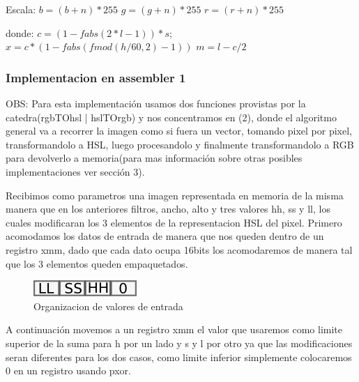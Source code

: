 \documentclass[a4paper]{article}
\begin{document}
\begin{enumerate}
		Escala:\newline
		$b = (b+n) * 255$\newline
		$g = (g+n) * 255$\newline
		$r = (r+n) * 255$\newline

		donde:\newline
		$c = ( 1 - fabs( 2*l - 1 )) * s;$\newline
		$x = c * ( 1 - fabs( fmod( h/60, 2 ) - 1 ) )$\newline
		$m = l - c / 2$\newline


\end{enumerate}

\subsubsection{Implementacion en assembler 1}
OBS: Para esta implementación usamos dos funciones provistas por la catedra(rgbTOhsl | hslTOrgb) y nos concentramos en (2), donde el algoritmo general va a recorrer la imagen como si fuera un vector, tomando pixel por pixel, transformandolo a HSL, luego procesandolo y finalmente transformandolo a RGB para devolverlo a memoria(para mas información sobre otras posibles implementaciones ver sección 3).



Recibimos como parametros una imagen representada en memoria de la misma manera que en los anteriores filtros, ancho, alto y tres valores hh, ss y ll, los cuales modificaran los 3 elementos de la representacion HSL del pixel.
Primero acomodamos los datos de entrada de manera que nos queden dentro de un registro xmm, dado que cada dato ocupa 16bits los acomodaremos de manera tal que los 3 elementos queden empaquetados.

\begin{figure}[H]
\centering
\includegraphics[scale=0.8]{imagenes/llsshh.png}
\caption{Organizacion de valores de entrada}
\label{lshValue6}
\end{figure}

A continuación movemos a un registro xmm el valor que usaremos como limite superior de la suma para h por un lado y s y l por otro ya que las modificaciones seran diferentes para los dos casos, como limite inferior simplemente colocaremos 0 en un registro usando pxor.
\end{document}
